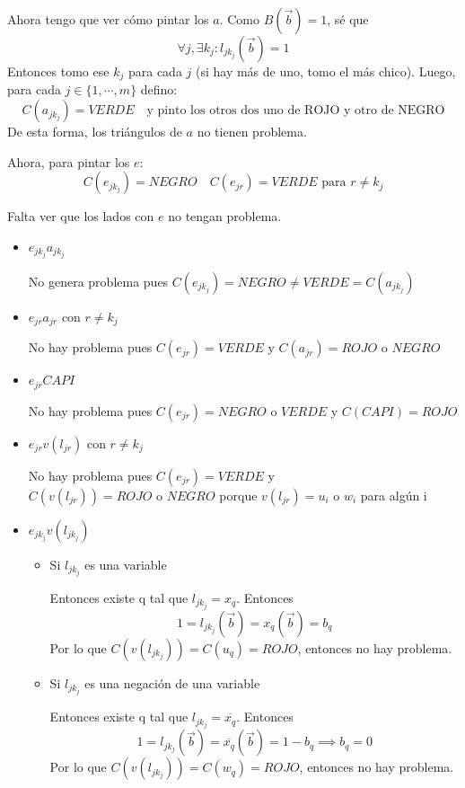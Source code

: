 \documentclass[11pt]{article}
\begin{document}
{Ahora tengo que ver cómo pintar los \(a\). Como \(B(\overrightarrow{b}) = 1\), sé que
      \[ \forall j, \exists k_j : l_{jk_j}(\overrightarrow{b})=1 \]
Entonces tomo ese \(k_j\) para cada \(j\) (si hay más de uno, tomo el más chico). Luego, para cada \(j \in \{1, \cdots, m\}\) defino:
      \[ C(a_{jk_j}) = VERDE \quad\text{y pinto los otros dos uno de ROJO y otro de NEGRO}\]
De esta forma, los triángulos de \(a\) no tienen problema.

Ahora, para pintar los \(e\):
      \[ C(e_{jk_j}) = NEGRO \quad C(e_{jr}) = VERDE \text{ para } r \ne k_j \]

Falta ver que los lados con \(e\) no tengan problema.
\begin{itemize}
\item \(e_{jk_j}a_{jk_j}\)

No genera problema pues \({C(e_{jk_j}) = NEGRO \ne VERDE = C(a_{jk_j})}\)

\item \(e_{jr}a_{jr}\) con \(r \ne k_j\)

No hay problema pues \({C(e_{jr}) = VERDE}\) y \({C(a_{jr}) = ROJO \text{ o } NEGRO}\)

\item \(e_{jr}CAPI\)

No hay problema pues \(C(e_{jr}) = NEGRO \text{ o } VERDE\) y \({C(CAPI) = ROJO}\)

\item \(e_{jr}v(l_{jr})\) con \(r \ne k_j\)

No hay problema pues \({C(e_{jr}) = VERDE}\) y \({C(v(l_{jr})) = ROJO \text{ o } NEGRO}\) porque \({v(l_{jr}) = u_i \text{ o } w_i}\) para algún i

\item \(e_{jk_j}v(l_{jk_j})\)

\begin{itemize}
\item Si \(l_{jk_j}\) es una variable

Entonces existe q tal que \({l_{jk_j} = x_q}\). Entonces
      \[1 = l_{jk_j}(\overrightarrow{b}) = x_q(\overrightarrow{b}) = b_q \]
Por lo que \({C(v(l_{jk_j})) = C(u_q) = ROJO}\), entonces no hay problema.

\item Si \(l_{jk_j}\) es una negación de una variable

Entonces existe q tal que \({l_{jk_j} = \overline{x_q}}\). Entonces
      \[1 = l_{jk_j}(\overrightarrow{b}) = \overline{x_q}(\overrightarrow{b}) = 1 - b_q \implies b_q = 0 \]
Por lo que \({C(v(l_{jk_j})) = C(w_q) = ROJO}\), entonces no hay problema.
\end{itemize}
\end{itemize}


}
\end{document}
